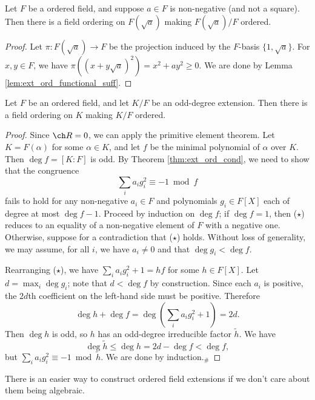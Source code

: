 \begin{corollary}
  \label{cor:ext_ord_to_adj_sqrt}
  \leanok
  Let $F$ be a ordered field, and suppose $a\in F$ is non-negative (and not a square). Then there is a field ordering on $F(\sqrt{a})$ making $F(\sqrt{a})/F$ ordered.
\end{corollary}
\begin{proof}
  \leanok
  Let $\pi:F(\sqrt{a})\to F$ be the projection induced by the $F$-basis $\{1,\sqrt{a}\}$. For $x,y\in F$, we have $\pi((x+y\sqrt{a})^2)=x^2+ay^2\geq0$. We are done by Lemma \ref{lem:ext_ord_functional_suff}.
\end{proof}

\begin{lemma}
  \label{lem:ext_ord_odd_deg}
  \leanok
  Let $F$ be an ordered field, and let $K/F$ be an odd-degree extension. Then there is a field ordering on $K$ making $K/F$ ordered.
\end{lemma}
\begin{proof}
  \leanok
  Since $\ch R=0$, we can apply the primitive element theorem. Let $K=F(\alpha)$ for some $\alpha\in K$, and let $f$ be the minimal polynomial of $\alpha$ over $K$. Then $\deg f=[K:F]$ is odd. By Theorem \ref{thm:ext_ord_cond}, we need to show that the congruence
  \[\sum_ia_ig_i^2\equiv-1\bmod f\tag{$\star$}\]
  fails to hold for any non-negative $a_i\in F$ and polynomials $g_i\in F[X]$ each of degree at most $\deg f-1$. Proceed by induction on $\deg f$; if $\deg f=1$, then ($\star$) reduces to an equality of a non-negative element of $F$ with a negative one. Otherwise, suppose for a contradiction that ($\star$) holds. Without loss of generality, we may assume, for all $i$, we have $a_i\neq0$ and that $\deg g_i<\deg f$.
  
  Rearranging ($\star$), we have $\sum_ia_ig_i^2+1=hf$ for some $h\in F[X]$. Let $d=\max_i\deg g_i$; note that $d<\deg f$ by construction. Since each $a_i$ is positive, the $2d$th coefficient on the left-hand side must be positive. Therefore
  \[\deg h+\deg f=\deg\left(\sum_ia_ig_i^2+1\right)=2d.\]
  Then $\deg h$ is odd, so $h$ has an odd-degree irreducible factor $\tilde h$. We have
  \[\deg\tilde h\leq\deg h=2d-\deg f<\deg f,\]
  but $\sum_ia_ig_i^2\equiv-1\bmod\tilde h$. We are done by induction.$_\#$
\end{proof}

There is an easier way to construct ordered field extensions if we don't care about them being algebraic.

